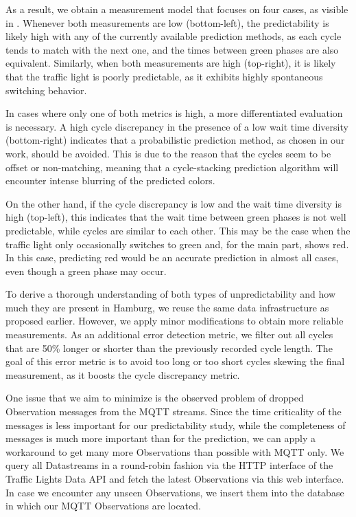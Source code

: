 As a result, we obtain a measurement model that focuses on four cases, as visible in . Whenever both measurements are low (bottom-left), the predictability is likely high with any of the currently available prediction methods, as each cycle tends to match with the next one, and the times between green phases are also equivalent. Similarly, when both measurements are high (top-right), it is likely that the traffic light is poorly predictable, as it exhibits highly spontaneous switching behavior. 

In cases where only one of both metrics is high, a more differentiated evaluation is necessary. A high cycle discrepancy in the presence of a low wait time diversity (bottom-right) indicates that a probabilistic prediction method, as chosen in our work, should be avoided. This is due to the reason that the cycles seem to be offset or non-matching, meaning that a cycle-stacking prediction algorithm will encounter intense blurring of the predicted colors. 

On the other hand, if the cycle discrepancy is low and the wait time diversity is high (top-left), this indicates that the wait time between green phases is not well predictable, while cycles are similar to each other. This may be the case when the traffic light only occasionally switches to green and, for the main part, shows red. In this case, predicting red would be an accurate prediction in almost all cases, even though a green phase may occur.

To derive a thorough understanding of both types of unpredictability and how much they are present in Hamburg, we reuse the same data infrastructure as proposed earlier. However, we apply minor modifications to obtain more reliable measurements. As an additional error detection metric, we filter out all cycles that are 50\% longer or shorter than the previously recorded cycle length. The goal of this error metric is to avoid too long or too short cycles skewing the final measurement, as it boosts the cycle discrepancy metric.

One issue that we aim to minimize is the observed problem of dropped Observation messages from the MQTT streams. Since the time criticality of the messages is less important for our predictability study, while the completeness of messages is much more important than for the prediction, we can apply a workaround to get many more Observations than possible with MQTT only. We query all Datastreams in a round-robin fashion via the HTTP interface of the Traffic Lights Data API and fetch the latest Observations via this web interface. In case we encounter any unseen Observations, we insert them into the database in which our MQTT Observations are located. 


